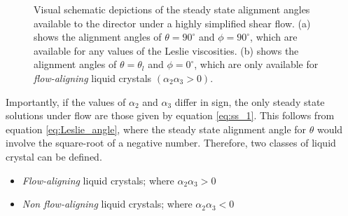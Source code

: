 \begin{figure}
\begin{center}
\hspace{0.2in}
\end{center}
\caption[Steady state alignment angles of a nematic liquid crystal]{\label{fig:ss} Visual schematic depictions of the steady state alignment angles available to the director under a highly simplified shear flow. (a) shows the alignment angles of $\theta=90^{\circ}$ and $\phi=90^{\circ}$, which are available for any values of the Leslie viscosities. (b) shows the alignment angles of $\theta=\theta_l$ and $\phi=0^{\circ}$, which are only available for \textit{flow-aligning} liquid crystals $\left(\alpha_2\alpha_3>0\right)$.}
\end{figure}

Importantly, if the values of $\alpha_2$ and $\alpha_3$ differ in sign, the only steady state solutions under flow are those given by equation \ref{eq:ss_1}. This follows from equation \ref{eq:Leslie_angle}, where the steady state alignment angle for $\theta$ would involve the square-root of a negative number. Therefore, two classes of liquid crystal can be defined.

\begin{itemize}
\item \textit{Flow-aligning} liquid crystals; where $\alpha_2\alpha_3>0$
\item \textit{Non flow-aligning} liquid crystals; where $\alpha_2\alpha_3<0$
\end{itemize}

